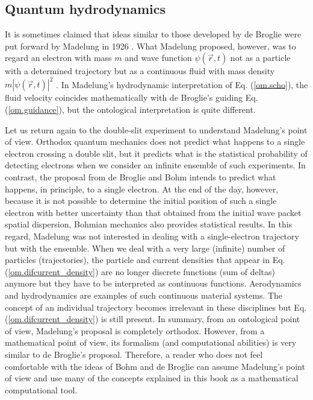 \documentclass[nofootinbib, secnumarabic, amsmath, nobibnotes,11pt,aps,pra, floatfix]{revtex4-1}
\newcommand{\eref}[1]{Eq. (\ref{#1})}
\newcommand{\abs}[1]{\left| #1 \right|} %
\begin{document}
\subsection{Quantum hydrodynamics}\label{om.sec_intro.9}

It is sometimes claimed that ideas similar to those developed by de Broglie were put forward by Madelung in 1926 \cite{om.Madelung}. What Madelung proposed, however, was to regard an electron with mass $m$ and wave function $\psi(\vec{r},t)$ not as a particle with a determined trajectory but as a continuous fluid with mass density $m \abs{\psi(\vec{r},t)}^2$ \cite{om.wyatt2005,om.Takabayasi}. In Madelung's hydrodynamic interpretation of \eref{om.scho}, the fluid velocity coincides mathematically with de Broglie's guiding \eref{om.guidance}, but the ontological interpretation is quite different.

Let us return again to the double-slit experiment to understand Madelung's point of view. Orthodox quantum mechanics does not predict what happens to a single electron crossing a double slit, but it predicts what is the statistical probability of detecting electrons when we consider an infinite ensemble of such experiments. In contrast, the proposal from de Broglie and Bohm intends to predict what happens, in principle, to a single electron. At the end of the day, however, because it is not possible to determine the initial position of such a single electron with better uncertainty than that obtained from the initial wave packet spatial dispersion, Bohmian mechanics also provides statistical results.
In this regard, Madelung was not interested in dealing with a single-electron trajectory but with the ensemble. When we deal with a very large (infinite) number of particles (trajectories), the particle and current densities that appear in \eref{om.difcurrent_density} are no longer discrete functions (sum of deltas) anymore but they have to be interpreted as continuous functions. Aerodynamics and hydrodynamics are examples of such continuous material systems. The concept of an individual trajectory becomes irrelevant in these disciplines but \eref{om.difcurrent_density} is still present. In summary, from an ontological point of view, Madelung's proposal is completely orthodox. However, from a mathematical point of view, its formalism (and computational abilities) is very similar to de Broglie's proposal. Therefore, a reader who does not feel comfortable with the ideas of Bohm and de Broglie can assume Madelung's point of view and use many of the concepts explained in this book as a mathematical computational tool.
\end{document}
